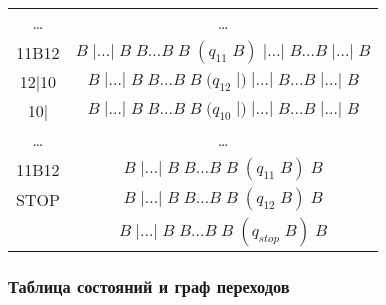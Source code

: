 \documentclass[a4paper, 12pt]{article}  %
\theoremstyle{definition}
\begin{document}
\begin{tabular}{ | c | c | }
		\dots & \dots \\
		11B12 & $ B \; | \dots | \; B \; B \dots B \; B \; (q_{11} \; B) \; | \dots | \; B \dots  B \; | \dots | \; B$ \\
		12|10 & $ B \; | \dots | \; B \; B \dots B \; B \; (q_{12} \; |) \; | \dots | \; B \dots  B \; | \dots | \; B$ \\
		10| & $ B \; | \dots | \; B \; B \dots B \; B \; (q_{10} \; |) \; | \dots | \; B \dots  B \; | \dots | \; B$ \\
		\dots & \dots \\
		11B12 & $ B \; | \dots | \; B \; B \dots B \; B \; (q_{11} \; B) \; B$\\
		STOP & $ B \; | \dots | \; B \; B \dots B \; B \; (q_{12} \; B) \; B$\\
		& $ B \; | \dots | \; B \; B \dots B \; B \; (q_{stop} \; B) \; B$\\
		\hline
	\end{tabular}
	
	\subsubsection*{Таблица состояний и граф переходов}
	
	\begin{center}
		
	\end{center}
	
\end{document}

